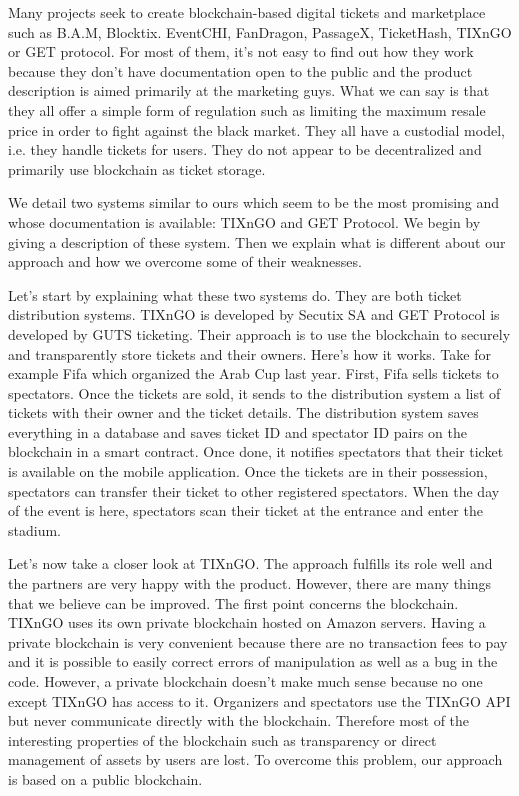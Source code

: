 \documentclass[a4paper,11pt,oneside]{report}
\begin{document}
Many projects seek to create blockchain-based digital tickets and marketplace such as B.A.M, Blocktix. EventCHI, FanDragon, PassageX, TicketHash, TIXnGO or GET protocol. For most of them, it's not easy to find out how they work because they don't have documentation open to the public and the product description is aimed primarily at the marketing guys. What we can say is that they all offer a simple form of regulation such as limiting the maximum resale price in order to fight against the black market. They all have a custodial model, i.e. they handle tickets for users. They do not appear to be decentralized and primarily use blockchain as ticket storage.

We detail two systems similar to ours which seem to be the most promising and whose documentation is available: TIXnGO and GET Protocol. We begin by giving a description of these system. Then we explain what is different about our approach and how we overcome some of their weaknesses.

Let's start by explaining what these two systems do. They are both ticket distribution systems. TIXnGO is developed by Secutix SA and GET Protocol is developed by GUTS ticketing. Their approach is to use the blockchain to securely and transparently store tickets and their owners. Here's how it works. Take for example Fifa which organized the Arab Cup last year. First, Fifa sells tickets to spectators. Once the tickets are sold, it sends to the distribution system a list of tickets with their owner and the ticket details. The distribution system saves everything in a database and saves ticket ID and spectator ID pairs on the blockchain in a smart contract. Once done, it notifies spectators that their ticket is available on the mobile application. Once the tickets are in their possession, spectators can transfer their ticket to other registered spectators. When the day of the event is here, spectators scan their ticket at the entrance and enter the stadium.

Let's now take a closer look at TIXnGO. The approach fulfills its role well and the partners are very happy with the product. However, there are many things that we believe can be improved. The first point concerns the blockchain. TIXnGO uses its own private blockchain hosted on Amazon servers. Having a private blockchain is very convenient because there are no transaction fees to pay and it is possible to easily correct errors of manipulation as well as a bug in the code. However, a private blockchain doesn't make much sense because no one except TIXnGO has access to it. Organizers and spectators use the TIXnGO API but never communicate directly with the blockchain. Therefore most of the interesting properties of the blockchain such as transparency or direct management of assets by users are lost. To overcome this problem, our approach is based on a public blockchain.
\end{document}
